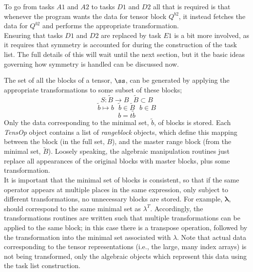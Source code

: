 \noindent To go from tasks $A1$ and $A2$ to tasks $D1$ and $D2$ all that is
required is that whenever the program wants the data for tensor block $Q^{b2}$,
it instead fetches the data for $Q^{b2}$ and performs the appropriate
transformation.\\

\noindent Ensuring that tasks $D1$ and $D2$ are replaced by task
$E1$ is a bit more involved, as it requires that symmetry is accounted 
for during the construction of the task list. The full details of this
will wait until the next section, but it the basic ideas governing 
how symmetry is handled can be discussed now.

\noindent The set of all the blocks of a tensor, $\ss$, can be generated by applying
the appropriate transformations to some subset of these blocks;
\begin{equation*}
S : \tilde{B} \rightarrow B  \text { \ \ \ } \tilde{B} \subset B
\end{equation*}
\begin{equation*}
   \tilde{b} \mapsto b   \text { \ \ \ } \tilde b\in \tilde{B} \text{ \ \ \ } b \in B
\end{equation*}
\begin{equation}
   b = t \tilde{b} 
\end{equation}
Only the data corresponding to the minimal set, $\tilde{b}$, of blocks is stored. 
Each \emph{TensOp} object contains a list of \emph{rangeblock} objects, which
define this mapping between the  block (in the full set, $B$), and
the master range block (from the minimal set, $\tilde{B}$). Loosely speaking,
the algebraic manipulation routines just replace all appearances of the original 
blocks with master blocks, plus some transformation.\\ 

\noindent It is important that the minimal set of blocks is consistent, so
that if the same operator appears at multiple places in the same expression, only
subject to different transformations, no unnecessary blocks are stored. For
example, $\mathbf{\lambda}$, should correspond to the same minimal
set as $\lambda^{T}$. Accordingly, the transformations routines are 
written such that multiple transformations can be applied to the same block; in this case
there is a transpose operation, followed by the transformation into the minimal set 
associated with $\lambda$. Note that actual data  corresponding to the tensor representations
(i.e., the large, many index arrays) is not being transformed, only the algebraic objects 
which represent this data using the task list construction.

